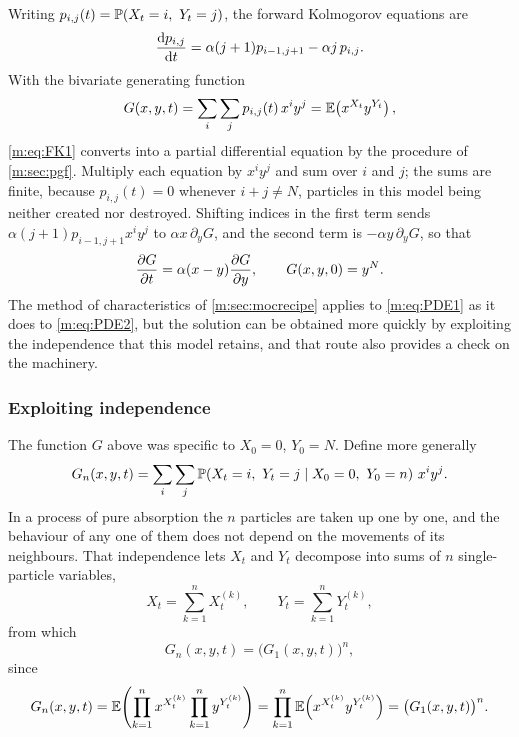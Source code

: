 Writing $p_{i,j}(t) = \pr{X_t=i,\ Y_t=j}$, the forward Kolmogorov equations
are
\begin{equation}
\label{m:eq:FK1}
\frac{\mathrm{d} p_{i,j}}{\mathrm{d} t} = \alpha(j+1)p_{i-1,j+1} - \alpha j\,p_{i,j} .
\end{equation}
With the bivariate generating function
\begin{equation}
\label{m:eq:pgfbiv}
G(x,y,t) = \sum_i\sum_j p_{i,j}(t)\,x^iy^j = \mathbb{E}\!\left(x^{X_t}y^{Y_t}\right),
\end{equation}
\cref{m:eq:FK1} converts into a partial differential equation by the procedure
of \cref{m:sec:pgf}. Multiply each equation by $x^iy^j$ and sum over $i$ and
$j$; the sums are finite, because $p_{i,j}(t)=0$ whenever $i+j\neq N$,
particles in this model being neither created nor destroyed. Shifting indices
in the first term sends $\alpha(j+1)p_{i-1,j+1}x^iy^j$ to
$\alpha x\,\partial_yG$, and the second term is $-\alpha y\,\partial_yG$, so
that
\begin{equation}
\label{m:eq:PDE1}
\frac{\partial G}{\partial t} = \alpha(x-y)\frac{\partial G}{\partial y},
\qquad G(x,y,0) = y^N .
\end{equation}
The method of characteristics of \cref{m:sec:mocrecipe} applies to
\cref{m:eq:PDE1} as it does to \cref{m:eq:PDE2}, but the solution can be
obtained more quickly by exploiting the independence that this model retains,
and that route also provides a check on the machinery.

\subsubsection*{Exploiting independence}

The function $G$ above was specific to $X_0=0$, $Y_0=N$. Define more generally
\begin{equation*}
G_n(x,y,t) = \sum_i\sum_j\mathbb{P}\!\left(X_t=i,\ Y_t=j \mid X_0=0,\ Y_0=n\right)\,x^iy^j .
\end{equation*}
In a process of pure absorption the $n$ particles are taken up one by one, and
the behaviour of any one of them does not depend on the movements of its
neighbours. That independence lets $X_t$ and $Y_t$ decompose into sums of $n$
single-particle variables,
\begin{equation*}
X_t = \sum_{k=1}^{n}X_t^{(k)},
\qquad
Y_t = \sum_{k=1}^{n}Y_t^{(k)},
\end{equation*}
from which
\begin{equation}
\label{m:eq:indRelPGF}
G_n(x,y,t) = \bigl(G_1(x,y,t)\bigr)^n ,
\end{equation}
since
\begin{equation*}
G_n(x,y,t)
= \mathbb{E}\!\left(\prod_{k=1}^{n}x^{X_t^{(k)}}\prod_{k=1}^{n}y^{Y_t^{(k)}}\right)
= \prod_{k=1}^{n}\mathbb{E}\!\left(x^{X_t^{(k)}}y^{Y_t^{(k)}}\right)
= \bigl(G_1(x,y,t)\bigr)^n .
\end{equation*}

